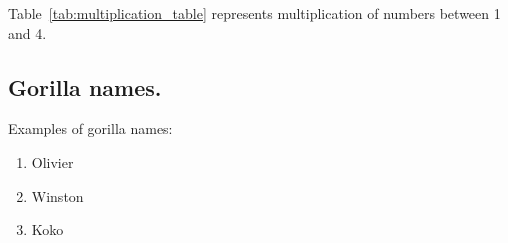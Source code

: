 \newpage
Table~\ref{tab:multiplication_table} represents multiplication of numbers between 1 and 4.

\hline
\subsection{\hspace{2em}Gorilla names.}
Examples of gorilla names:
\begin{enumerate}
    \item Olivier
    \item Winston
    \item Koko
\end{enumerate}
